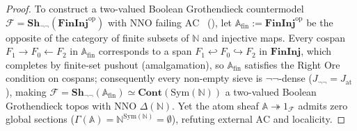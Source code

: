 \documentclass[10pt,twoside,openright]{book}
\theoremstyle{crmplain}
\theoremstyle{crmdef}
\theoremstyle{crmremark}
\begin{document}
\begin{proof}
To construct a two-valued Boolean Grothendieck countermodel $\mathcal{F} = \mathbf{Sh}_{\neg\neg}(\mathbf{FinInj}^{\mathrm{op}})$ with $\mathrm{NNO}$ failing $\mathrm{AC}$~\cite{Freyd72} (\cite[\S D4.5]{Johnstone02}), let $\mathbb{A}_{\mathrm{fin}} := \mathbf{FinInj}^{\mathrm{op}}$ be the opposite of the category of finite subsets of $\mathbb{N}$ and injective maps. Every cospan $F_1 \to F_0 \leftarrow F_2$ in $\mathbb{A}_{\mathrm{fin}}$ corresponds to a span $F_1 \hookleftarrow F_0 \hookrightarrow F_2$ in $\mathbf{FinInj}$, which completes by finite-set pushout (amalgamation), so $\mathbb{A}_{\mathrm{fin}}$ satisfies the Right Ore condition on cospans; consequently every non-empty sieve is $\neg\neg$-dense ($J_{\neg\neg} = J_{\mathrm{at}}$), making $\mathcal{F} = \mathbf{Sh}_{\neg\neg}(\mathbb{A}_{\mathrm{fin}}) \simeq \mathbf{Cont}(\mathrm{Sym}(\mathbb{N}))$ a two-valued Boolean Grothendieck topos with $\mathrm{NNO}$ $\Delta(\mathbb{N})$. Yet the atom sheaf $\mathbb{A} \twoheadrightarrow 1_{\mathcal{F}}$ admits zero global sections ($\Gamma(\mathbb{A}) = \mathbb{N}^{\mathrm{Sym}(\mathbb{N})} = \emptyset$), refuting external $\mathrm{AC}$ and localicity.


\end{proof}
\end{document}
